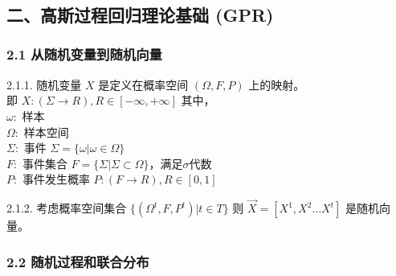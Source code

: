 \documentclass[11pt]{article}
\begin{document}
    \begin{center}
    \end{center}
    { \hspace*{\fill} \\}
    
    \begin{center}
    \end{center}
    { \hspace*{\fill} \\}
    
    \begin{center}
    \end{center}
    { \hspace*{\fill} \\}
    
    \subsection{二、高斯过程回归理论基础
(GPR)}\label{ux4e8cux9ad8ux65afux8fc7ux7a0bux56deux5f52ux7406ux8bbaux57faux7840-gpr}

    \subsubsection{2.1
从随机变量到随机向量}\label{ux4eceux968fux673aux53d8ux91cfux5230ux968fux673aux5411ux91cf}

2.1.1. 随机变量 \(X\) 是定义在概率空间 \((\Omega,F,P)\) 上的映射。\\
即 \(X:(\Sigma{\rightarrow}R),R\in[-\infty,+\infty]\) 其中，\\
\(\omega:\) 样本\\
\(\Omega:\) 样本空间\\
\(\Sigma:\) 事件 \(\Sigma=\{\omega|\omega\in\Omega\}\)\\
\(F:\) 事件集合
\(F=\{\Sigma|\Sigma\subset\Omega\}\)，满足\(\sigma\)代数\\
\(P:\) 事件发生概率 \(P:(F{\rightarrow}R),R\in[0,1]\)

2.1.2. 考虑概率空间集合 \(\{(\Omega^t,F,P^t)|t\in{T}\}\) 则
\(\vec{X}=[X^1, X^2 ... X^t]\) 是随机向量。

    \subsubsection{2.2
随机过程和联合分布}\label{ux968fux673aux8fc7ux7a0bux548cux8054ux5408ux5206ux5e03}
\end{document}
